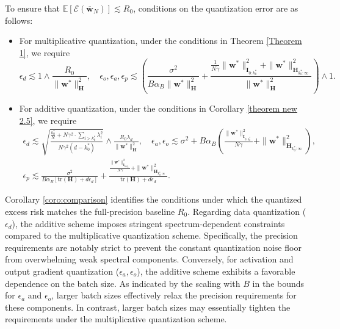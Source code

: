 \documentclass[11pt, letterpaper]{article}
\begin{document}
\begin{corollary}\label{coro:comparison}
To ensure that $\mathbb E[\mathcal E(\overline{\mathbf w}_N)]\lesssim R_0$, conditions on the quantization error are as follows:
\begin{itemize}[leftmargin=*,nosep]
\item For multiplicative quantization, under the conditions in Theorem \ref{Theorem 1}, we require
    \begin{equation*}
        \epsilon_d\lesssim 1\wedge \frac{R_0}{\|\mathbf{w}^*\|_{\mathbf{H}}^2},\quad\epsilon_o,\epsilon_a,\epsilon_p \lesssim  \left(\frac{\sigma^2}{B\alpha_B\|\mathbf{w}^*\|_\mathbf{H}^2}+\frac{\frac{1}{N\gamma}\|{\mathbf{w}}^*\|_{\mathbf{I}_{0:k_0^*}}^2+\|{\mathbf{w}}^*\|_{\mathbf{H}_{k_0^*:\infty}}^2}{\|\mathbf{w}^*\|_\mathbf{H}^2}\right)\wedge 1.
    \end{equation*}
\item For additive quantization, under the conditions in Corollary \ref{theorem new 2.5}, we require
\begin{gather*}
        \epsilon_d\lesssim \sqrt{\frac{\frac{k_0^*}{N}+N\gamma^2\cdot\sum_{i>k_0^*}\lambda_i^2}{N\gamma^2(d-k_0^*)}}\wedge \frac{R_0\lambda_d}{\|\mathbf{w}^*\|_{\mathbf{H}}^2},\quad \epsilon_a,\epsilon_o\lesssim \sigma^2+B\alpha_B\left(\frac{\|{\mathbf{w}}^*\|_{\mathbf{I}_{0:k_0^*}}^2}{N\gamma}+\|{\mathbf{w}}^*\|_{\mathbf{H}_{k_0^*:\infty}}^2\right), \\ 
        \epsilon_p\lesssim \frac{\sigma^2}{B\alpha_B[\mathrm{tr}(\mathbf{H})+d\epsilon_d]}+\frac{\frac{\|{\mathbf{w}}^*\|_{\mathbf{I}_{0:k_0^*}}^2}{N\gamma}+\|{\mathbf{w}}^*\|_{\mathbf{H}_{k_0^*:\infty}}^2}{\mathrm{tr}(\mathbf{H})+d\epsilon_d}.
    \end{gather*}
\end{itemize}
\end{corollary}

Corollary \ref{coro:comparison} identifies the conditions under which the quantized excess risk matches the full-precision baseline $R_0$. 
Regarding data quantization ($\epsilon_d$), the additive scheme imposes stringent spectrum-dependent constraints compared to the multiplicative quantization scheme. Specifically, the precision requirements are notably strict to prevent the constant quantization noise floor from overwhelming weak spectral components. Conversely, for activation and output gradient quantization ($\epsilon_a,\epsilon_o$), the additive scheme exhibits a favorable dependence on the batch size. As indicated by the scaling with $B$ in the bounds for $\epsilon_a$ and $\epsilon_o$, larger batch sizes effectively relax the precision requirements for these components. In contrast, larger batch sizes may essentially tighten the requirements under the multiplicative quantization scheme.
\end{document}

